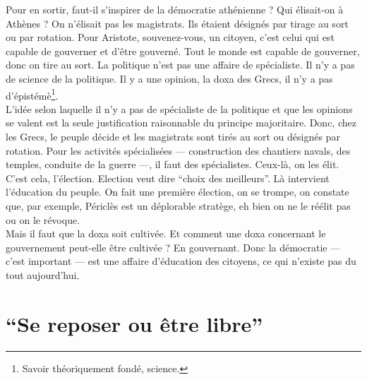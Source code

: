 Pour en sortir, faut-il s’inspirer de la démocratie athénienne ? Qui élisait-on à Athènes ? On n’élisait pas les magistrats. Ils étaient désignés par tirage au sort ou par rotation. Pour Aristote, souvenez-vous, un citoyen, c’est celui qui est capable de gouverner et d’être gouverné. Tout le monde est capable de gouverner, donc on tire au sort. La politique n’est pas une affaire de spécialiste. Il n’y a pas de science de la politique. Il y a une opinion, la doxa des Grecs, il n’y a pas d’épistémè\footnote{Savoir théoriquement fondé, science.}.\\
L’idée selon laquelle il n’y a pas de spécialiste de la politique et que les opinions se valent est la seule justification raisonnable du principe majoritaire. Donc, chez les Grecs, le peuple décide et les magistrats sont tirés au sort ou désignés par rotation. Pour les activités spécialisées --- construction des chantiers navals, des temples, conduite de la guerre ---, il faut des spécialistes. Ceux-là, on les élit. C’est cela, l’élection. Election veut dire ``choix des meilleurs''. Là intervient l’éducation du peuple. On fait une première élection, on se trompe, on constate que, par exemple, Périclès est un déplorable stratège, eh bien on ne le réélit pas ou on le révoque.\\
Mais il faut que la doxa soit cultivée. Et comment une doxa concernant le gouvernement peut-elle être cultivée ? En gouvernant. Donc la démocratie --- c’est important --- est une affaire d’éducation des citoyens, ce qui n’existe pas du tout aujourd’hui.

\section*{``Se reposer ou être libre''}

